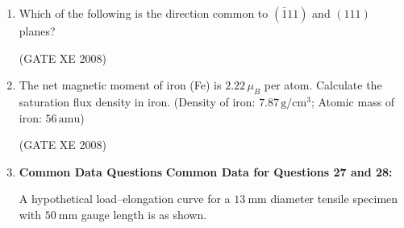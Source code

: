 \documentclass[12pt]{article}
\begin{document}
\begin{enumerate}
\begin{enumerate}
\end{enumerate}

(GATE XE 2008)

\item Which of the following is the direction common to $(\bar{1}11)$ and $(111)$ planes?

\begin{enumerate}
\end{enumerate}

(GATE XE 2008)

\item The net magnetic moment of iron (Fe) is $2.22 \, \mu_B$ per atom. Calculate the saturation flux density in iron. (Density of iron: $7.87 \, \mathrm{g/cm^3}$; Atomic mass of iron: $56 \, \mathrm{amu}$)

\begin{enumerate}
\end{enumerate}

(GATE XE 2008)



\item[] \textbf{\Large Common Data Questions}
\textbf{Common Data for Questions 27 and 28:}

A hypothetical load–elongation curve for a $13 \ \mathrm{mm}$ diameter tensile specimen with $50 \ \mathrm{mm}$ gauge length is as shown.


\end{enumerate}
\end{document}
